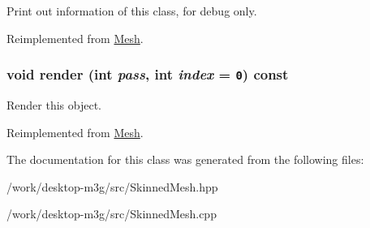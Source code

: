 Print out information of this class, for debug only. 

Reimplemented from \hyperlink{classm3g_1_1Mesh_6fea17fa1532df3794f8cb39cb4f911f}{Mesh}.\hypertarget{classm3g_1_1SkinnedMesh_1efcb1973989d9963d5bd6d03065d389}{
\subsubsection[{render}]{\setlength{\rightskip}{0pt plus 5cm}void render (int {\em pass}, \/  int {\em index} = {\tt 0}) const}}
\label{classm3g_1_1SkinnedMesh_1efcb1973989d9963d5bd6d03065d389}


Render this object. 

Reimplemented from \hyperlink{classm3g_1_1Mesh_1efcb1973989d9963d5bd6d03065d389}{Mesh}.

The documentation for this class was generated from the following files:\begin{CompactItemize}
\item 
/work/desktop-m3g/src/SkinnedMesh.hpp\item 
/work/desktop-m3g/src/SkinnedMesh.cpp\end{CompactItemize}
